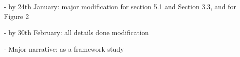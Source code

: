 - by 24th January: major modification for section 5.1 and Section 3.3, and for Figure 2

- by 30th February: all details done modification 

- Major narrative: as a framework study  

